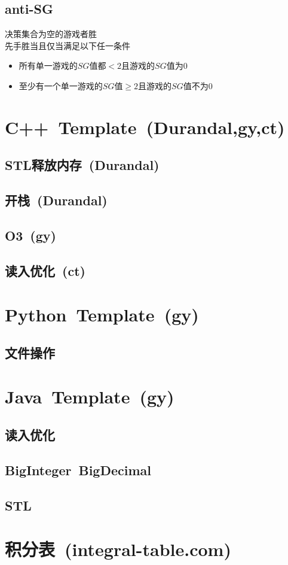     \subsection*{anti-SG}
        决策集合为空的游戏者胜
        \\先手胜当且仅当满足以下任一条件
        \begin{itemize}[nosep,wide=0pt]
            \item 所有单一游戏的$ SG $值都$ < 2 $且游戏的$ SG $值为$ 0 $
            \item 至少有一个单一游戏的$ SG $值$ \geq 2 $且游戏的$ SG $值不为$ 0 $
        \end{itemize}
\section{C++\ Template\ \small(Durandal,gy,ct)}
    \subsection*{STL释放内存\ \small(Durandal)}
    \subsection*{开栈\ \small(Durandal)}
    \subsection*{O3\ \small(gy)}
    \subsection*{读入优化\ \small(ct)}
\section{Python\ Template\ \small(gy)}
    \subsection*{文件操作}
\section{Java\ Template\ \small(gy)}
    \subsection*{读入优化}
    \subsection*{BigInteger\ BigDecimal}
    \subsection*{STL}
\section{积分表\ \small(integral-table.com)}
    \begin{multicols}{2}
        
    \end{multicols}
